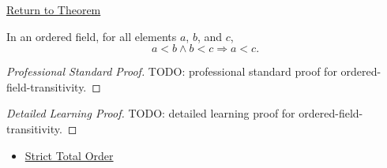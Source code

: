 \newpage
{}
\label{prf:ordered-field-transitivity}

\begin{remark*}[Return]
\hyperref[thm:ordered-field-transitivity]{Return to Theorem}
\end{remark*}

\begin{theorem*}
In an ordered field, for all elements $a$, $b$, and $c$,
\[
a<b \land b<c \Longrightarrow a<c.
\]
\end{theorem*}

\begin{proof}[Professional Standard Proof]
\LRAProofBodyStart
TODO: professional standard proof for ordered-field-transitivity.
\end{proof}

\begin{proof}[Detailed Learning Proof]
\LRAProofBodyStart
TODO: detailed learning proof for ordered-field-transitivity.
\end{proof}

\begin{remark*}
\end{remark*}

\begin{dependencies}
\begin{itemize}
  \item \hyperref[def:strict-total-order]{Strict Total Order}
\end{itemize}
\end{dependencies}

\clearpage
